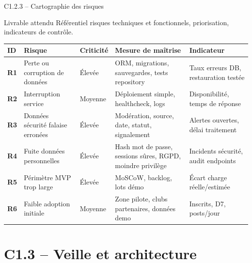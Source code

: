 \documentclass[aspectratio=169,11pt]{beamer}
\newcommand{\competence}[2]{%
  \begin{block}{#1}
    #2
  \end{block}
}
\begin{document}
\begin{frame}{C1.2.3 -- Cartographie des risques}
  \competence{Livrable attendu}{Référentiel risques techniques et fonctionnels, priorisation, indicateurs de contrôle.}
  \tiny
  \begin{tabularx}{\textwidth}{>{\bfseries}p{1.2cm} p{2.8cm} p{1.6cm} X X}
    ID & Risque & Criticité & Mesure de maîtrise & Indicateur \\
    \hline
    R1 & Perte ou corruption de données & Élevée & ORM, migrations, sauvegardes, tests repository & Taux erreurs DB, restauration testée \\
    R2 & Interruption service & Moyenne & Déploiement simple, healthcheck, logs & Disponibilité, temps de réponse \\
    R3 & Données sécurité falaise erronées & Élevée & Modération, source, date, statut, signalement & Alertes ouvertes, délai traitement \\
    R4 & Fuite données personnelles & Élevée & Hash mot de passe, sessions sûres, RGPD, moindre privilège & Incidents sécurité, audit endpoints \\
    R5 & Périmètre MVP trop large & Élevée & MoSCoW, backlog, lots démo & Écart charge réelle/estimée \\
    R6 & Faible adoption initiale & Moyenne & Zone pilote, clubs partenaires, données demo & Inscrits, D7, posts/jour \\
  \end{tabularx}
\end{frame}

\section{C1.3 -- Veille et architecture}
\end{document}
